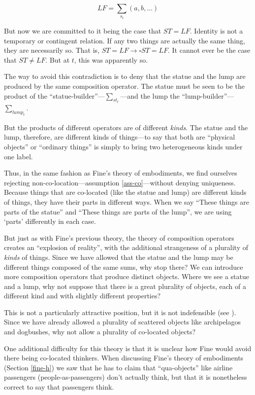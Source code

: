 \documentclass[12pt,twoside]{reedfancy}
\begin{document}
\begin{spacing}{1.25}
\begin{displaymath}
LF = \sum_{s_t} (a, b, ... )
\end{displaymath}

But now we are committed to it being the case that $ST = LF$.
Identity is not a temporary or contingent relation.  If any two things
are actually the same thing, they are necessarily so.  That is, $ST =
LF \rightarrow \square ST = LF$.  It cannot ever be the case that $ST
\neq LF$.  But at $t$, this was apparently so.

The way to avoid this contradiction is to deny that the statue and the
lump are produced by the same composition operator.  The statue must
be seen to be the product of the ``statue-builder''---$\sum
_{st_t}$---and the lump the ``lump-builder''---$\sum _{lump_t}$.

But the products of different operators are of different {\em kinds}.
The statue and the lump, therefore, are different kinds of things---to
say that both are ``physical objects'' or ``ordinary things'' is
simply to bring two heterogeneous kinds under one label.

Thus, in the same fashion as Fine's theory of embodiments, we find
ourselves rejecting non-co-location---assumption
\ref{ass-co}---without denying uniqueness.  Because things that are
co-located (like the statue and lump) are different kinds of things,
they have their parts in different ways.  When we say ``These things
are parts of the statue'' and ``These things are parts of the lump'',
we are using `parts' differently in each case.

But just as with Fine's previous theory, the theory of composition
operators creates an ``explosion of reality'', with the additional
strangeness of a plurality of {\em kinds} of things.  Since we have
allowed that the statue and the lump may be different things composed
of the same sums, why stop there?  We can introduce more composition
operators that produce distinct objects.  Where we see a statue and a
lump, why not suppose that there is a great plurality of objects, each
of a different kind and with slightly different properties?

This is not a particularly attractive position, but it is not
indefensible (see \citet[Section 4]{bennett2004}).  Since we have
already allowed a plurality of scattered objects like archipelagos and
dogbushes, why not allow a plurality of co-located objects?

One additional difficulty for this theory is that it is unclear how
Fine would avoid there being co-located thinkers.  When discussing
Fine's theory of embodiments (Section \ref{fine-h}) we saw that he has
to claim that ``qua-objects'' like airline passengers
(people-as-passengers) don't actually think, but that it is
nonetheless correct to say that passengers think.


\end{spacing}
\end{document}
